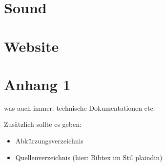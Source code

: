 \documentclass[
    headings=optiontotocandhead,%
    twoside,
    numbers=noenddot,%
    toc=flat, %
    12pt, %
    titlepage, %
    parskip=full, %
    listof=totoc, %
    listof=flat, %
    numbers=noenddot, %
    bibliography=totoc, %
    a4paper,DIV=14,
    BCOR=15mm,
]{scrbook}
\begin{document}
\renewcommand{\kapitelautor}{}



\chapter{Sound}

\renewcommand{\kapitelautor}{}



\chapter{Website}

\renewcommand{\kapitelautor}{}





%

%

%


\appendix

\chapter{Anhang 1\label{chap:Anhang-1}}

was auch immer: technische Dokumentationen etc.

Zusätzlich sollte es geben:
\begin{itemize}
\item Abkürzungsverzeichnis
\item Quellenverzeichnis (hier: Bibtex im Stil plaindin) 
\end{itemize}
\printindex{}
\end{document}
